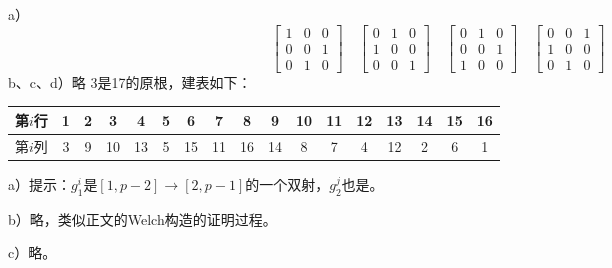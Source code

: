 %
\exercise a）
\[\begin{bmatrix}
1 & 0 & 0 \\ 
0 & 0 & 1 \\  
0 & 1 & 0 
\end{bmatrix}\quad
\begin{bmatrix}
0 & 1 & 0 \\ 
1 & 0 & 0 \\  
0 & 0 & 1 
\end{bmatrix}\quad
\begin{bmatrix}
0 & 1 & 0 \\ 
0 & 0 & 1 \\ 
1 & 0 & 0  
\end{bmatrix}\quad
\begin{bmatrix}
0 & 0 & 1 \\ 
1 & 0 & 0 \\ 
0 & 1 & 0  
\end{bmatrix}\]
b、c、d）略
%
\exercise 3是17的原根，建表如下：
\begin{center}
\begin{tabular}{c*{16}{|c}}
\hline
第$i$行 & 1 & 2 & 3 & 4 & 5 & 6 & 7 & 8 & 9 & 10 & 11 & 12 & 13 & 14 & 15 & 16 \\
\hline
第$i$列 & 3 & 9 & 10 & 13 & 5 & 15 & 11 & 16 & 14 & 8 & 7 & 4 & 12 & 2 & 6 & 1 \\
\hline
\end{tabular}
\end{center}
%
\exercise a）提示：$g_1^i$是$[1,p-2]\rightarrow[2,p-1]$的一个双射，$g_2^j$也是。\par
b）略，类似正文的Welch构造的证明过程。\par
c）略。